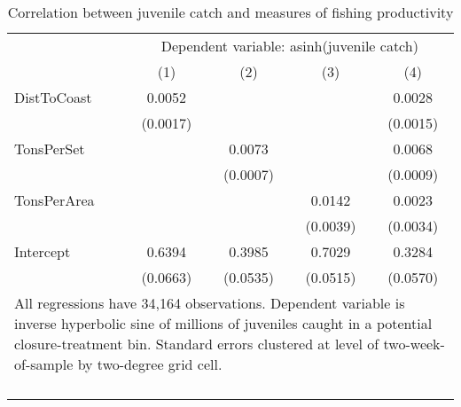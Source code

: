 \begin{table}[tb]
\centering
\caption{Correlation between juvenile catch and measures of fishing productivity} 
\label{balance_relevantvariables}
\begin{tabular}{lcccc}
   \toprule & \multicolumn{4}{c}{Dependent variable: asinh(juvenile catch)} \\  & (1) & (2) & (3) & (4) \\ 
   \midrule DistToCoast & 0.0052 &  &  & 0.0028 \\ 
   & (0.0017) &  &  & (0.0015) \\ 
  TonsPerSet &  & 0.0073 &  & 0.0068 \\ 
   &  & (0.0007) &  & (0.0009) \\ 
  TonsPerArea &  &  & 0.0142 & 0.0023 \\ 
   &  &  & (0.0039) & (0.0034) \\ 
  Intercept & 0.6394 & 0.3985 & 0.7029 & 0.3284 \\ 
   & (0.0663) & (0.0535) & (0.0515) & (0.0570) \\ 
   \bottomrule \multicolumn{5}{l}{\multirow{2}{11cm}{All regressions have 34,164 observations. Dependent variable is inverse hyperbolic sine of millions of juveniles caught in a potential closure-treatment bin. Standard errors clustered at level of two-week-of-sample by two-degree grid cell.}} \\\\\\\\\\\\ \end{tabular}
\end{table}
